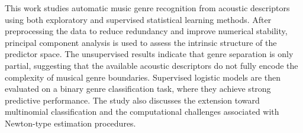This work studies automatic music genre recognition from acoustic descriptors using both exploratory and supervised statistical learning methods. After preprocessing the data to reduce redundancy and improve numerical stability, principal component analysis is used to assess the intrinsic structure of the predictor space. The unsupervised results indicate that genre separation is only partial, suggesting that the available acoustic descriptors do not fully encode the complexity of musical genre boundaries. Supervised logistic models are then evaluated on a binary genre classification task, where they achieve strong predictive performance. The study also discusses the extension toward multinomial classification and the computational challenges associated with Newton-type estimation procedures. 